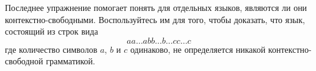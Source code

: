 \begin{exercise}
Последнее упражнение помогает понять для отдельных языков, являются ли они контекстно-свободными. Воспользуйтесь им для того, чтобы доказать, что язык, состоящий из строк вида $$aa\ldots abb\ldots b\ldots cc\ldots c$$ где количество символов $a$, $b$ и $c$ одинаково, не определяется никакой контекстно-свободной грамматикой.
\end{exercise}
